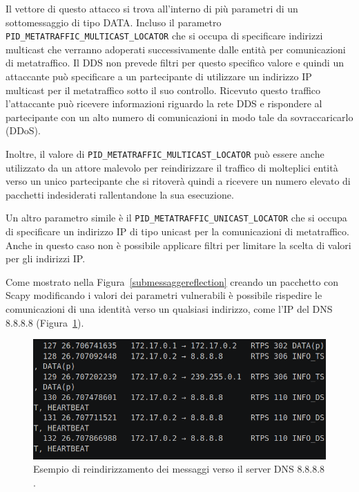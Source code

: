Il vettore di questo attacco si trova all'interno di più parametri 
di un sottomessaggio di tipo DATA. 
Incluso il parametro 
\texttt{PID\_METATRAFFIC\_MULTICAST\_LOCATOR} che si occupa di specificare 
indirizzi multicast che verranno adoperati successivamente dalle 
entità per comunicazioni di metatraffico.
Il DDS non prevede filtri per questo 
specifico valore e quindi un attaccante può specificare a un 
partecipante di utilizzare un indirizzo IP multicast per il metatraffico 
sotto il suo controllo. Ricevuto questo traffico l'attaccante può 
ricevere informazioni riguardo la rete DDS e rispondere al partecipante
con un alto numero di comunicazioni in modo tale da sovraccaricarlo (DDoS).

Inoltre, il valore 
di \texttt{PID\_METATRAFFIC\_MULTICAST\_LOCATOR} può essere anche utilizzato 
da un attore malevolo per reindirizzare il traffico di molteplici 
entità verso un unico partecipante che si ritoverà quindi a ricevere un 
numero elevato di pacchetti indesiderati rallentandone la sua esecuzione.

Un altro parametro simile è il \texttt{PID\_METATRAFFIC\_UNICAST\_LOCATOR}
che si occupa di specificare un indirizzo IP di tipo unicast 
per la comunicazioni di metatraffico. Anche in questo caso non è
possibile applicare filtri per limitare la scelta di valori per 
gli indirizzi IP. 

Come mostrato nella 
Figura~\ref{submessaggereflection} creando un pacchetto con Scapy
modificando i valori dei parametri vulnerabili 
è possibile 
rispedire le comunicazioni di una identità verso un qualsiasi
indirizzo, come l'IP del DNS 8.8.8.8 (Figura~\ref{reflectionattackdns}).


\begin{figure}[H]
    \centering
    \includegraphics[width=15.2cm, keepaspectratio]{img/reflectionattackdns.png}
    \caption{Esempio di reindirizzamento dei messaggi verso il server DNS 8.8.8.8
    \cite{mayoral2022robot}.}
    \label{reflectionattackdns}
\end{figure}


